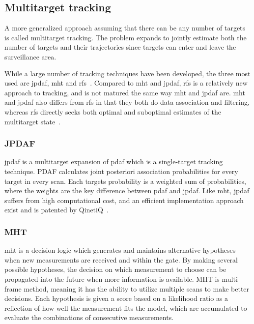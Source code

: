 \subsection{Multitarget tracking}
A more generalized approach assuming that there can be any number of targets is called multitarget tracking. The problem expands to jointly estimate both the number of targets and their trajectories since targets can enter and leave the surveillance area. 

While a large number of tracking techniques have been developed, the three most used are \gls{jpdaf}, \gls{mht} and \gls{rfs}~\cite{Vo2015}. Compared to \gls{mht} and \gls{jpdaf}, \gls{rfs} is a relatively new approach to tracking, and is not  matured the same way \gls{mht} and \gls{jpdaf} are. \gls{mht} and \gls{jpdaf} also differs from \gls{rfs} in that they both do data association and filtering, whereas \gls{rfs} directly seeks both optimal and suboptimal estimates of the multitarget state~\cite{Vo2015}.

\subsubsection{JPDAF}
\gls{jpdaf} is a multitarget expansion of \gls{pdaf} which is a single-target tracking technique. PDAF calculates joint posteriori association probabilities for every target in every scan. Each targets probability is a weighted sum of probabilities, where the weights are the key difference between \gls{pdaf} and \gls{jpdaf}. Like \gls{mht}, \gls{jpdaf} suffers from high computational cost, and an efficient implementation approach exist and is patented by QinetiQ~\cite{Horridge}.

\subsubsection{MHT}
\gls{mht} is a decision logic which generates and maintains alternative hypotheses when new \glspl{measurement} are received and within the gate. By making several possible hypotheses, the decision on which \gls{measurement} to choose can be propagated into the future when more information is available. MHT is multi frame method, meaning it has the ability to utilize multiple scans to make better decisions. Each hypothesis is given a \gls{score} based on a likelihood ratio as a reflection of how well the measurement fits the model, which are accumulated to evaluate the combinations of consecutive \glspl{measurement}.

